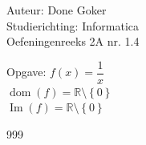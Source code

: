 \documentclass[a4paper]{article}
\begin{document}
  
\noindent \large Auteur: Done Goker \\
\noindent \large Studierichting: Informatica\\
\noindent \large Oefeningenreeks 2A nr. 1.4\\

\medskip

\normalsize

Opgave: $f(x) = \dfrac{1}{x}$ \\

$\operatorname{dom}(f) = \mathbb{R} \setminus \left\{ 0\right\}$\\

$\operatorname{Im}(f) = \mathbb{R} \setminus \left\{ 0\right\}$



\begin{thebibliography}{999}
\end{thebibliography}
\end{document}
